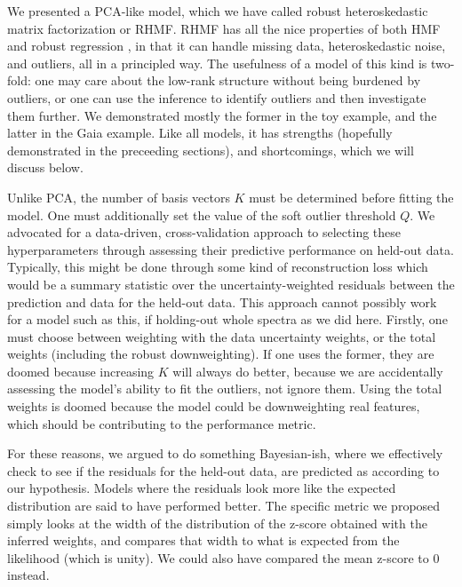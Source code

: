 \documentclass[onecolumn,floatfix]{aastex631}
\begin{document}

We presented a PCA-like model, which we have called robust heteroskedastic matrix factorization or RHMF.
RHMF has all the nice properties of both HMF \citep{tsalmantza2012} and robust regression \citep{holland1977, hoaglin1983}, in that it can handle missing data, heteroskedastic noise, and outliers, all in a principled way.
The usefulness of a model of this kind is two-fold: one may care about the low-rank structure without being burdened by outliers, or one can use the inference to identify outliers and then investigate them further.
We demonstrated mostly the former in the toy example, and the latter in the Gaia example.
Like all models, it has strengths (hopefully demonstrated in the preceeding sections), and shortcomings, which we will discuss below.


Unlike PCA, the number of basis vectors $K$ must be determined before fitting the model.
One must additionally set the value of the soft outlier threshold $Q$.
We advocated for a data-driven, cross-validation approach to selecting these hyperparameters through assessing their predictive performance on held-out data.
Typically, this might be done through some kind of reconstruction loss which would be a summary statistic over the uncertainty-weighted residuals between the prediction and data for the held-out data.
This approach cannot possibly work for a model such as this, if holding-out whole spectra as we did here.
Firstly, one must choose between weighting with the data uncertainty weights, or the total weights (including the robust downweighting).
If one uses the former, they are doomed because increasing $K$ will always do better, because we are accidentally assessing the model's ability to fit the outliers, not ignore them.
Using the total weights is doomed because the model could be downweighting real features, which should be contributing to the performance metric.

For these reasons, we argued to do something Bayesian-ish, where we effectively check to see if the residuals for the held-out data, are predicted as according to our hypothesis.
Models where the residuals look more like the expected distribution are said to have performed better.
The specific metric we proposed simply looks at the width of the distribution of the z-score obtained with the inferred weights, and compares that width to what is expected from the likelihood (which is unity).
We could also have compared the mean z-score to 0 instead.
\end{document}
